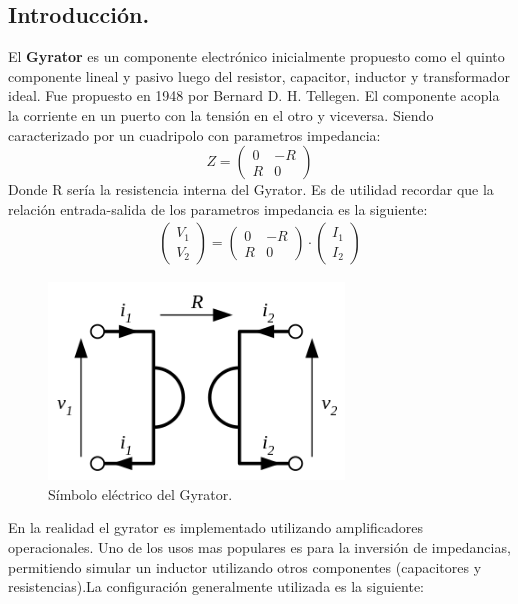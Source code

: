 \documentclass[a4paper]{article}
\begin{document}
\subsection{Introducción.}
El \textbf{Gyrator} es un componente electrónico inicialmente propuesto como el quinto componente lineal y pasivo luego del resistor, capacitor, inductor y transformador ideal. Fue propuesto en 1948 por Bernard D. H. Tellegen. El componente acopla la  corriente en un puerto con la tensión en el otro y viceversa. Siendo caracterizado por un cuadripolo con parametros impedancia:
$$ Z= \left(\begin{matrix}0&-R\\R&0\end{matrix}\right) $$
Donde R sería la resistencia interna del Gyrator.
Es de utilidad recordar que la relación entrada-salida de los parametros impedancia es la siguiente:
\begin{align} \left(\begin{matrix}V_1\\V_2\end{matrix}\right) =   \left(\begin{matrix}0&-R\\R&0\end{matrix}\right)  \cdot \left(\begin{matrix}I_1\\I_2\end{matrix}\right) \end{align}
\begin{figure}[H]	
	\centering
	\includegraphics[width=0.7\textwidth]{ImagenesEj2/gyratorsimb.png}
	\caption{Símbolo eléctrico del Gyrator.}
	\label{fig:gyrsimb}
\end{figure}
En la realidad el gyrator es implementado utilizando amplificadores operacionales. Uno de los usos mas populares es para la inversión de impedancias, permitiendo simular un inductor utilizando otros componentes (capacitores y resistencias).La configuración generalmente utilizada es la siguiente:
\end{document}
